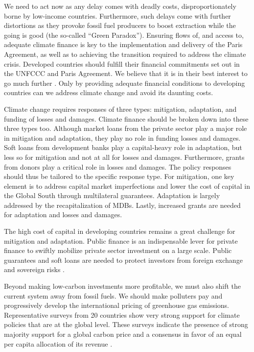 \documentclass[12pt,english]{article}
\begin{document}
\begin{bibunit}
We need to act now as any delay comes with deadly costs, disproportionately borne by low-income countries. Furthermore, such delays come with further distortions as they provoke fossil fuel producers to boost extraction while the going is good (the so-called ``Green Paradox''). Ensuring flows of, and access to, adequate climate finance is key to the implementation and delivery of the Paris Agreement, as well as to achieving the transition required to address the climate crisis. Developed countries should fulfill their financial commitments set out in the UNFCCC and Paris Agreement. We believe that it is in their best interest to go much further \citep{bolton_why_2025}. Only by providing adequate financial conditions to developing countries can we address climate change and avoid its daunting costs.

Climate change requires responses of three types: mitigation, adaptation, and funding of losses and damages. Climate finance should be broken down into these three types too. Although market loans from the private sector play a major role in mitigation and adaptation, they play no role in funding losses and damages. Soft loans from development banks play a capital-heavy role in adaptation, but less so for mitigation and not at all for losses and damages. Furthermore, grants from donors play a critical role in losses and damages. The policy responses should thus be tailored to the specific response type. For mitigation, one key element is to address capital market imperfections and lower the cost of capital in the Global South through multilateral guarantees. Adaptation is largely addressed by the recapitalization of MDBs. Lastly, increased grants are needed for adaptation and losses and damages.

The high cost of capital in developing countries remains a great challenge for mitigation and adaptation. Public finance is an indispensable lever for private finance to swiftly mobilize private sector investment on a large scale. Public guarantees and soft loans are needed to protect investors from foreign exchange and sovereign risks \citep{hourcade_climate_2025}.

Beyond making low-carbon investments more profitable, we must also shift the current system away from fossil fuels. We should make polluters pay and progressively develop the international pricing of greenhouse gas emissions. Representative surveys from 20 countries show very strong support for climate policies that are at the global level. These surveys indicate the presence of strong majority support for a global carbon price and a consensus in favor of an equal per capita allocation of its revenue \citep{fabre_majority_2025}.


\end{bibunit}
\end{document}
